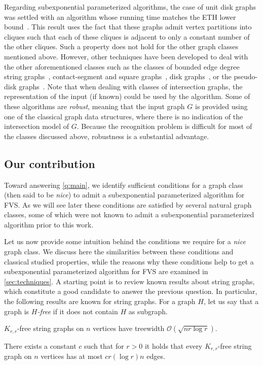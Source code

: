 \documentclass{amsart}
\newcommand{\FVS}{\textsc{FVS}\xspace}
\renewcommand{\O}{\mathcal{O}}
\begin{document}
Regarding subexponential parameterized algorithms, the case of unit disk graphs was settled with an algorithm whose running time matches the ETH lower bound~\cite{an_unit_21}. This result uses the fact that these graphs admit vertex partitions into cliques such that each of these cliques is adjacent to only a constant number of the other cliques. Such a property does not hold for the other graph classes mentioned above. 
However, other techniques have been developed to deal with the other aforementioned classes such as the classes of bounded edge degree string graphs~\cite{baste2022contraction}, contact-segment and square graphs~\cite{berthe24ASQGM}, disk graphs~\cite{lokSODA22,Faster2023Shinwoo}, or the pseudo-disk graphs~\cite{FVS-WG}.
Note that when dealing with classes of intersection graphs, the representation of the input (if known) could be used by the algorithm.
Some of these algorithms are {\em robust}, meaning that the input graph $G$ is provided using one of the classical graph data structures, where there is no indication of the intersection model of $G$. Because the recognition problem is difficult for most of the classes discussed above, robustness is a substantial advantage.



\subsection{Our contribution}
Toward answering \autoref{q:main}, we identify sufficient conditions for a graph class (then said to be \emph{nice}) to admit a subexponential parameterized algorithm for \FVS. 
As we will see later these conditions are satisfied by several natural graph classes, some of which were not known to admit a subexponential parameterized algorithm prior to this work.

Let us now provide some intuition behind the conditions we require for a \emph{nice} graph class. We discuss here the similarities between these conditions and classical studied properties, while the reasons why these conditions help to get a subexponential parameterized algorithm for \FVS are examined in \autoref{sec:techniques}.
A starting point is to review known results about string graphs, which constitute a good candidate to answer the previous question. In particular, the following results are known for string graphs. For a graph $H$, let us say that a graph is \emph{$H$-free} if it does not contain $H$ as subgraph.
\begin{theorem}\label{th:tw}
$K_{r,r}$-free string graphs on $n$ vertices have treewidth $\O(\sqrt{nr\log r})$.
\end{theorem}
\begin{theorem}\label{th:Lee}
    There exists a constant $c$ such that for $r>0$ it holds that every $K_{r,r}$-free string graph on $n$ vertices has at most $cr(\log r) n$ edges.
\end{theorem}
\end{document}
